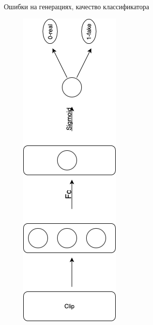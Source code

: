 \documentclass[aspectratio=169]{beamer}
\begin{document}
\begin{frame}{Ошибки на генерациях, качество классификатора}
\begin{figure}[ht]
\begin{minipage}{0.10\textwidth}
        \includegraphics[width=\linewidth]{figs/scheme.png}

\end{minipage}
\end{figure}
\end{frame}
\end{document}
